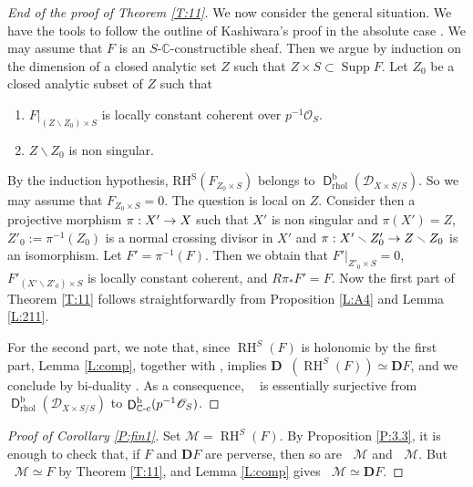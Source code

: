 \documentclass[english]{smfart}
\numberwithin{subsection}{section}
\def\shd{\mathcal{D}}\let\cD\shd
\def\shm{\mathcal{M}}
\def\sho{\mathcal{O}}\let\cO\sho
\newcommand{\C}{\mathbb{C}}\let\CC\C
\newcommand{\bD}{\boldsymbol{D}}
\DeclareMathOperator{\RH}{RH}
\newcommand{\rb}{\mathrm{b}}
\newcommand{\rhol}{\mathrm{rhol}}
\newcommand{\cc}{{\C\textup{-c}}}
\newcommand{\XS}{X\times S}
\newcommand{\DXS}{\shd_{\XS/S}}
\DeclareMathOperator{\rD}{\mathsf{D}}
\DeclareMathOperator{\pDR}{{}^\mathrm{p}DR}
\DeclareMathOperator{\pSol}{{}^\mathrm{p}Sol}
\DeclareMathOperator{\supp}{Supp}
\let\setminus\smallsetminus
\newcommand{\pOS}{p^{-1}\sho_S}
\numberwithin{equation}{section}
\theoremstyle{plain}
\theoremstyle{definition}
\def\to{\mathchoice{\longrightarrow}{\rightarrow}{\rightarrow}{\rightarrow}}
\begin{document}
\begin{proof}[End of the proof of Theorem \ref{T:11}]
We now consider the general situation. We have the tools to follow the outline of Kashiwara's proof in the absolute case \cite[\S7.3]{Kashiwara84}.
We may assume that $F$ is an $S$\nobreakdash-$\CC$\nobreakdash-cons\-truc\-tible sheaf. Then we argue by induction on the dimension of a closed analytic set $Z$ such that $Z\times S\subset \supp F$. Let $Z_0$ be a closed analytic subset of $Z$ such that
\begin{enumerate}
\item{$F|_{(Z\setminus Z_0)\times S}$ is locally constant coherent over $\pOS$.}
\item{$Z\setminus Z_0$ is non singular.}
\end{enumerate}

By the induction hypothesis, $\mathrm{RH^S}(F_{Z_0\times S})$ belongs to $\rD^\rb_{\rhol}(\DXS)$. So we may assume that $F_{Z_0\times S}=0$. The question is local on $Z$. Consider then a projective morphism $\pi:X'\to X$ such that $X'$ is non singular and $\pi(X')=Z$, $Z'_0:=\pi^{-1}(Z_0)$ is a normal crossing divisor in $X'$ and $\pi: X'\setminus Z'_0\to Z\setminus Z_0$ is an isomorphism. Let $F'=\pi^{-1}(F)$. Then we obtain that $F'|_{Z'_0\times S}=0$, $F'_{(X'\setminus Z'_0)\times S}$ is locally constant coherent, and $R\pi_*F'=F$. Now the first part of Theorem \ref{T:11} follows straightforwardly from Proposition \ref{L:A4} and Lemma \ref {L:211}.

For the second part, we note that, since $\RH^S(F)$ is holonomic by the first part, Lemma \ref{L:comp}, together with \cite[Cor.\,3.9]{MF-S12}, implies $\bD\pSol(\RH^S(F))\simeq\bD F$, and we conclude by bi-duality \cite[Prop.\,2.23]{MF-S12}. As a consequence, $\pSol$ is essentially surjective from $\rD^\rb_{\rhol}(\DXS)$ to $\rD^\rb_\cc(\pOS)$.
\end{proof}

\begin{proof}[Proof of Corollary \ref{P:fin1}]
Set $\shm=\RH^S(F)$. By Proposition \ref{P:3.3}, it is enough to check that, if $F$ and $\bD F$ are perverse, then so are $\pSol\shm$ and $\pDR\shm$. But $\pSol\shm\simeq F$ by Theorem \ref{T:11}, and Lemma \ref{L:comp} gives $\pDR\shm\simeq\bD F$.
\end{proof}
\end{document}
